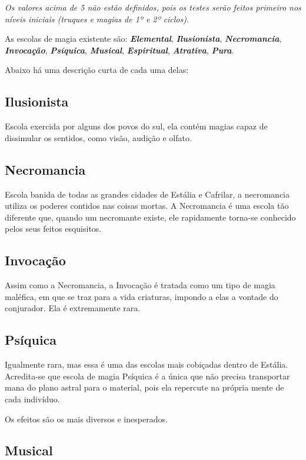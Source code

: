 \documentclass{RPG_Adventure}[2021/10/20]
\begin{document}
\begin{multicols}{2}
\textit{Os valores acima de 5 não estão definidos, pois os testes serão feitos
primeiro nos níveis iniciais (truques e magias de 1º e 2º ciclos).}

As escolas de magia existente são: \textbf{\textit{Elemental}},
\textbf{\textit{Ilusionista}}, \textbf{\textit{Necromancia}},
\textbf{\textit{Invocação}}, \textbf{\textit{Psíquica}},
\textbf{\textit{Musical}}, \textbf{\textit{Espiritual}},
\textbf{\textit{Atrativa}}, \textbf{\textit{Pura}}.

Abaixo há uma descrição curta de cada uma delas:

\subsection*{Ilusionista}%

Escola exercida por alguns dos povos do sul, ela contém magias capaz de
dissimular os sentidos, como visão, audição e olfato.

\subsection*{Necromancia}%

Escola banida de todas as grandes cidades de Estália e Cafrilar, a necromancia
utiliza os poderes contidos nas coisas mortas. A Necromancia é uma escola tão
diferente que, quando um necromante existe, ele rapidamente torna-se conhecido
pelos seus feitos esquisitos.

\subsection*{Invocação}%

Assim como a Necromancia, a Invocação é tratada como um tipo de magia maléfica,
em que se traz para a vida criaturas, impondo a elas a vontade do conjurador.
Ela é extremamente rara.

\subsection*{Psíquica}%

Igualmente rara, mas essa é uma das escolas mais cobiçadas dentro de Estália.
Acredita-se que escola de magia Psíquica é a única que não precisa transportar
mana do plano astral para o material, pois ela repercute na própria mente de
cada indivíduo.

Os efeitos são os mais diversos e inesperados.

\subsection*{Musical}%


\end{multicols}
\end{document}
